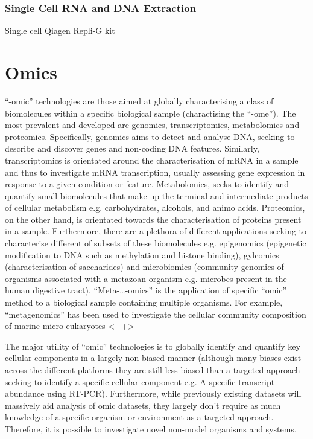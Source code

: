 \subsubsection{Single Cell RNA and DNA Extraction}


Single cell 
Qiagen Repli-G kit





\section{Omics}
``-omic'' technologies are those aimed at globally characterising a class of biomolecules 
within a specific biological sample (charactising the ``-ome''). The most prevalent and developed 
are genomics, transcriptomics, metabolomics and proteomics. Specifically, genomics aims to detect and analyse DNA, seeking to describe and discover genes and non-coding DNA
features. Similarly, transcriptomics is orientated around the characterisation
of mRNA in a sample and thus to investigate mRNA transcription, usually assessing
gene expression in response to a given condition or feature. 
Metabolomics, seeks to identify and quantify small biomolecules that make up the terminal and
intermediate products of cellular metabolism e.g. carbohydrates, alcohols, and animo acids.
Proteomics, on the other hand, is orientated towards the characterisation  
of proteins present in a sample. 
Furthermore, there are a plethora of different applications seeking to characterise
different of subsets of these biomolecules e.g. epigenomics (epigenetic modification to DNA such as methylation
and histone binding), gylcomics (characterisation of saccharides) and microbiomics (community genomics of organisms associated with a metazoan organism e.g. microbes present in the human digestive tract).
``Meta-\ldots-omics'' is the application of specific ``omic'' method to a biological sample 
containing multiple organisms. For example, ``metagenomics'' has been used to investigate
the cellular community composition of marine micro-eukaryotes \citep{}<++> %

The major utility of ``omic'' technologies is to globally identify and quantify key cellular components
in a largely non-biased manner (although many biases exist across the different platforms
they are still less biased than a targeted approach seeking to identify a specific cellular component
e.g. A specific transcript abundance using RT-PCR). Furthermore, while previously existing
datasets will massively aid analysis of omic datasets, they largely don't require
as much  knowledge of a specific organism or environment as a targeted approach.
Therefore, it is possible to investigate novel non-model organisms and systems.

